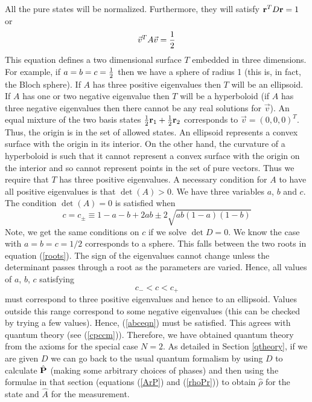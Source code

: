 \documentclass[12pt]{article}
\begin{document}
All the pure states will be normalized.
Furthermore, they will satisfy ${\bf r}^TD{\bf r}=1$ or
\begin{equation}
\vec{v}^T A \vec{v} = {1\over 2}
\end{equation}
This equation defines a two dimensional surface $T$ embedded in three
dimensions.  For example, if $a=b=c={1\over 2}$ then we have a sphere of
radius 1 (this is, in fact, the Bloch sphere).  If $A$ has three positive
eigenvalues then $T$ will be an ellipsoid.  If $A$ has one or two negative
eigenvalue then $T$ will be a hyperboloid (if
$A$ has three negative eigenvalues then there cannot be any real
solutions for $\vec{v}$). An equal mixture of the two basis
states ${1\over 2} {\bf r}_1 +{1\over 2}{\bf r}_2$ corresponds to
$\vec{v}=(0,0,0)^T$.  Thus, the origin is in the set of allowed states.
An ellipsoid represents a convex surface with the origin in its
interior.  On the other hand, the curvature of a hyperboloid is such
that it cannot represent a convex surface with the origin on the
interior and so cannot represent points in the set of pure
vectors.  Thus we require that $T$ has three positive eigenvalues.   A
necessary condition for $A$ to have all
positive eigenvalues is that $\det(A) > 0$.  We have three variables
$a$, $b$ and $c$.  The condition $\det(A)=0$ is satisfied when
\begin{equation}\label{roots}
c=c_{\pm}\equiv 1-a-b+2ab \pm 2\sqrt{ab(1-a)(1-b)}
\end{equation}
Note, we get the same conditions on $c$ if we solve $\det{D}=0$.
We know the case with $a=b=c=1/2$ corresponds to a sphere.  This falls
between the two roots in equation (\ref{roots}).  The sign of the
eigenvalues cannot change unless the determinant passes through a root
as the parameters are varied.  Hence, all values of $a$, $b$, $c$
satisfying
\begin{equation}\label{abceqn}
c_{-}< c < c_{+}
\end{equation}
must correspond to three positive eigenvalues and hence to an ellipsoid.
Values outside this range correspond to some negative eigenvalues (this
can be checked by trying a few values).  Hence, (\ref{abceqn}) must be
satisfied. This agrees with quantum theory (see (\ref{cpccm})).
Therefore, we have obtained
quantum theory from the axioms for the special case $N=2$.
As detailed in Section \ref{qtheory}, if we are given $D$ we can go back to the
usual quantum formalism by using $D$ to calculate $\hat{\bf P}$ (making
some arbitrary choices of phases) and then using the formulae in that
section (equations (\ref{ArP}) and (\ref{rhoPr}))
to obtain $\hat{\rho}$ for the state and $\hat{A}$ for the
measurement.
\end{document}
